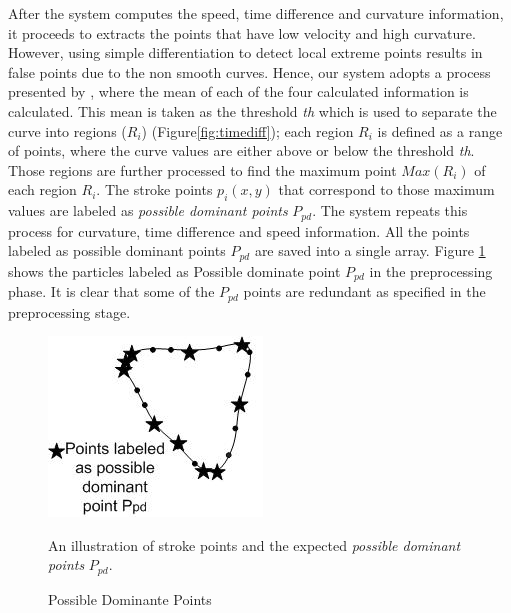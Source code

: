 \documentclass[preprint,10pt,5p,twocolumn]{elsarticle}
\begin{document}
After the system computes the speed, time difference and curvature information, it proceeds to extracts the points that have low velocity and high curvature. However, using simple differentiation to detect local extreme points results in false points due to the non smooth curves. Hence, our system adopts a process presented by \cite{earlyprocess}, where the mean of each of the four calculated information is calculated. This mean is taken as the threshold \textit{th} which is used to separate the curve into regions ($R_i$) (Figure\ref{fig:timediff}); each region $R_i$ is defined as a range of points, where the curve values are either above or below the threshold \textit{th}. Those regions are further processed to find the maximum point $Max(R_i)$ of each region $R_i$. The stroke points $p_i(x,y)$ that correspond to those maximum values are labeled as \textit{possible dominant points} $P_{pd}$. The system repeats this process for curvature, time difference and speed information. All the points labeled as possible dominant points $P_{pd}$ are saved into a single array. Figure \ref{fig:ppd999} shows the particles labeled as Possible dominate point $P_{pd}$ in the preprocessing phase. It is clear that some of the $P_{pd}$ points are redundant as specified in the preprocessing stage. %
\begin{figure}
	\centering
\includegraphics[scale=0.7]{images/ppd.jpg}
	\caption{Possible Dominante Points} An illustration of stroke points and the expected \textit{possible dominant points} $P_{pd}$.  
	\label{fig:ppd999}	
\end{figure}
\end{document}
